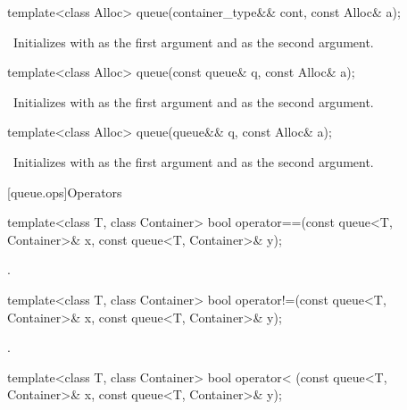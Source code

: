\begin{codeblock}
\begin{itemdecl}
template<class Alloc> queue(container_type&& cont, const Alloc& a);
\end{itemdecl}

\begin{itemdescr}
\pnum
\effects\ Initializes  with  as the first argument and 
as the second argument.
\end{itemdescr}

\begin{itemdecl}
template<class Alloc> queue(const queue& q, const Alloc& a);
\end{itemdecl}

\begin{itemdescr}
\pnum
\effects\ Initializes  with  as the first argument and  as the
second argument.
\end{itemdescr}

\begin{itemdecl}
template<class Alloc> queue(queue&& q, const Alloc& a);
\end{itemdecl}

\begin{itemdescr}
\pnum
\effects\ Initializes  with  as the first argument and 
as the second argument.
\end{itemdescr}

[queue.ops]{Operators}

%
\begin{itemdecl}
template<class T, class Container>
  bool operator==(const queue<T, Container>& x, const queue<T, Container>& y);
\end{itemdecl}

\begin{itemdescr}
\pnum
\returns
{}.
\end{itemdescr}

%
\begin{itemdecl}
template<class T, class Container>
  bool operator!=(const queue<T, Container>& x,  const queue<T, Container>& y);
\end{itemdecl}

\begin{itemdescr}
\pnum
\returns
{}.
\end{itemdescr}

%
\begin{itemdecl}
template<class T, class Container>
  bool operator< (const queue<T, Container>& x, const queue<T, Container>& y);
\end{itemdecl}


\end{codeblock}
